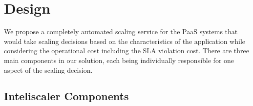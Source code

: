\section{Design}
We propose a completely automated scaling service for the PaaS systems that would take scaling decisions based on the characteristics of the application while considering the operational cost including the SLA violation cost. There are three main components in our solution, each being individually responsible for one aspect of the scaling decision.\\

\subsection{Inteliscaler Components}
